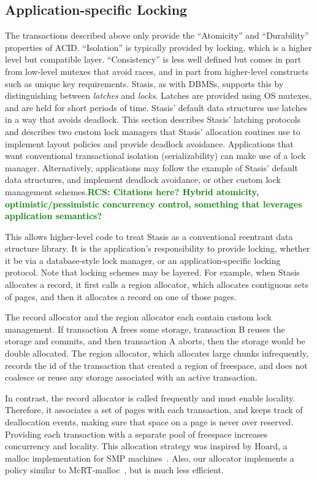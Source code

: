 \documentclass[letterpaper,twocolumn,10pt]{article}
\newcommand{\yad}{Stasis\xspace}
\newcommand{\yads}{Stasis'\xspace}
\newcommand{\rcs}[1]{\textcolor{green}{\bf RCS: #1}}
\begin{document}
\subsection{Application-specific Locking}
\label{sec:locking}
The transactions described above only provide the
``Atomicity'' and ``Durability'' properties of ACID.
  ``Isolation'' is
typically provided by locking, which is a higher level but
compatible layer.  ``Consistency'' is less well defined but comes in
part from low-level mutexes that avoid races, and in part from
higher-level constructs such as unique key requirements.  \yad, as with DBMSs,
supports this by distinguishing between {\em latches} and {\em locks}.
Latches are provided using OS mutexes, and are held for
short periods of time.  \yads default data structures use latches in a
way that avoids deadlock.  This section describes \yads latching
protocols and describes two custom lock
managers that \yads allocation routines use to implement layout 
policies and provide deadlock avoidance.  Applications that want
conventional transactional isolation (serializability) can make 
use of a lock manager.  Alternatively, applications may follow 
the example of \yads default data structures, and implement 
deadlock avoidance, or other custom lock management schemes.\rcs{Citations here? Hybrid atomicity, optimistic/pessimistic concurrency control, something that leverages application semantics?}

This allows higher-level code to treat \yad as a conventional
reentrant data structure library.  It is the application's
responsibility to provide locking, whether it be via a database-style
lock manager, or an application-specific locking protocol.  Note that
locking schemes may be layered.  For example, when \yad allocates a
record, it first calls a region allocator, which allocates contiguous
sets of pages, and then it allocates a record on one of those pages.

The record allocator and the region allocator each contain custom lock
management.  If transaction A frees some storage, transaction B reuses
the storage and commits, and then transaction A aborts, then the
storage would be double allocated.  The region allocator, which allocates large chunks infrequently, records the id
of the transaction that created a region of freespace, and does not
coalesce or reuse any storage associated with an active transaction.

In contrast, the record allocator is called frequently and must enable locality.  Therefore, it associates a set of pages with
each transaction, and keeps track of deallocation events, making sure
that space on a page is never over reserved.  Providing each
transaction with a separate pool of freespace increases 
concurrency and locality.  This allocation strategy was inspired by
Hoard, a malloc implementation for SMP machines~\cite{hoard}.  Also, 
our allocator implements a policy similar to 
McRT-malloc~\cite{mcrt-malloc}, but is much less efficient.
\end{document}
